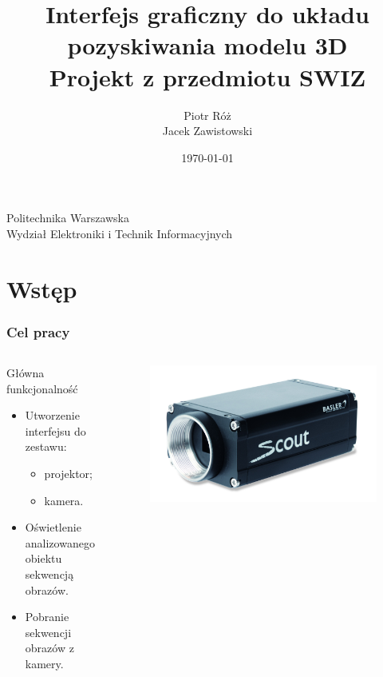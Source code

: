 \documentclass{beamer}
\begin{document}
\title{Interfejs graficzny do układu\\ pozyskiwania modelu 3D \\ Projekt z przedmiotu SWIZ}  
\author{Piotr Róż \\ Jacek Zawistowski}
\institute
{
  Politechnika Warszawska\\
  Wydział Elektroniki i Technik Informacyjnych\\
}
\date{\today} 

\begin{frame}
\titlepage
\end{frame}

\section{Wstęp}
\begin{frame}\frametitle{Cel pracy}

  \begin{columns}
  
    \begin{column}{6cm}
      \begin{block}{Główna funkcjonalność}
	\begin{itemize}
	\item Utworzenie interfejsu do zestawu:
	  \begin{itemize}
	  \item projektor;
	  \item kamera. 
	  \end{itemize}\pause
	\item Oświetlenie analizowanego obiektu sekwencją obrazów.\pause
	\item Pobranie sekwencji obrazów z kamery.
	\end{itemize}
      \end{block}
    \end{column}
  
    \begin{column}{6cm}
      \begin{figure}[htb]
	\begin{center}
	  \includegraphics[angle=0,scale=0.05]{kamera.jpg}
	\end{center}
      \end{figure}
      

\end{column}
\end{columns}
\end{frame}
\end{document}
